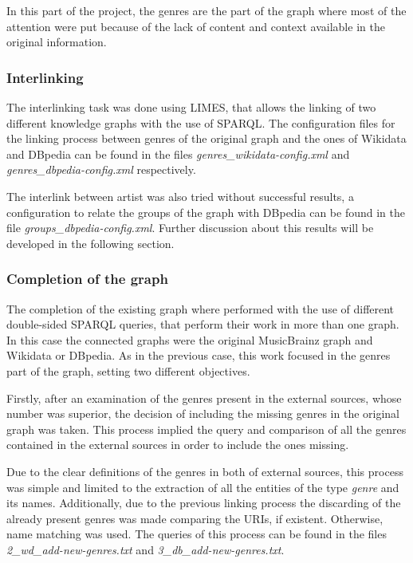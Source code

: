 In this part of the project, the genres are the part of the graph where most of the attention were put because of the lack of content and context available in the original information.

\subsubsection{Interlinking}
The interlinking task was done using LIMES, that allows the linking of two different knowledge graphs with the use of SPARQL. The configuration files for the linking process between genres of the original graph and the ones of Wikidata and DBpedia can be found in the files \textit{genres\_wikidata-config.xml} and \textit{genres\_dbpedia-config.xml} respectively.  

The interlink between artist was also tried without successful results, a configuration to relate the groups of the graph with DBpedia can be found in the file \textit{groups\_dbpedia-config.xml}. Further discussion about this results will be developed in the following section.

\subsubsection{Completion of the graph}
The completion of the existing graph where performed with the use of different double-sided SPARQL queries, that perform their work in more than one graph. 
In this case the connected graphs were the original MusicBrainz graph and Wikidata or DBpedia.
As in the previous case, this work focused in the genres part of the graph, setting two different objectives. 

Firstly, after an examination of the genres present in the external sources, whose number was superior, the decision of including the missing genres in the original graph was taken.
This process implied the query and comparison of all the genres contained in the external sources in order to include the ones missing.  

Due to the clear definitions of the genres in both of external sources, this process was simple and limited to the extraction of all the entities of the type \textit{genre} and its names.
Additionally, due to the previous linking process the discarding of the already present genres was made comparing the URIs, if existent. Otherwise, name matching was used.
The queries of this process can be found in the files \textit{2\_wd\_add-new-genres.txt} and \textit{3\_db\_add-new-genres.txt}. 

